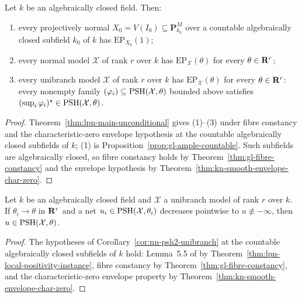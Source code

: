 \begin{theorem}
\label{thm:fu-model-main}
\leanok
Let $k$ be an algebraically closed field. Then:
\begin{enumerate}
\item every projectively normal $X_0=V(I_0)\subseteq\mathbf P^M_{k_0}$ over a
countable algebraically closed subfield $k_0$ of $k$ has
$\mathrm{EP}_{X_0}(1)$;
\item every normal model $\mathcal X$ of rank $r$ over $k$ has
$\mathrm{EP}_{\mathcal X}(\theta)$ for every $\theta\in\mathbf{R}^r$;
\item every unibranch model $\mathcal X$ of rank $r$ over $k$ has
$\mathrm{EP}_{\mathcal X}(\theta)$ for every $\theta\in\mathbf{R}^r$: every nonempty
family $(\varphi_i)\subseteq\operatorname{PSH}(\mathcal X,\theta)$ bounded above satisfies
$(\sup_i\varphi_i)^\star\in\operatorname{PSH}(\mathcal X,\theta)$.
\end{enumerate}
\end{theorem}
\begin{proof}
Theorem~\ref{thm:lpn-main-unconditional} gives (1)--(3) under fibre constancy
and the characteristic-zero envelope hypothesis at the countable algebraically
closed subfields of $k$; (1) is Proposition~\ref{prop:gl-ample-countable}. Such
subfields are algebraically closed, so fibre constancy holds by
Theorem~\ref{thm:gl-fibre-constancy} and the envelope hypothesis by
Theorem~\ref{thm:kn-smooth-envelope-char-zero}.
\end{proof}

\begin{corollary}
\label{cor:fu-model-psh2-unibranch}
\leanok
Let $k$ be an algebraically closed field and $\mathcal X$ a unibranch model of
rank $r$ over $k$. If $\theta_i\to\theta$ in $\mathbf{R}^r$ and a net
$u_i\in\operatorname{PSH}(\mathcal X,\theta_i)$ decreases pointwise to
$u\not\equiv-\infty$, then $u\in\operatorname{PSH}(\mathcal X,\theta)$.
\end{corollary}
\begin{proof}
The hypotheses of Corollary~\ref{cor:nn-psh2-unibranch} at the countable
algebraically closed subfields of $k$ hold: Lemma~5.5 of \cite{FHX} by
Theorem~\ref{thm:lpn-local-positivity-instance}, fibre constancy by
Theorem~\ref{thm:gl-fibre-constancy}, and the characteristic-zero envelope
property by Theorem~\ref{thm:kn-smooth-envelope-char-zero}.
\end{proof}

